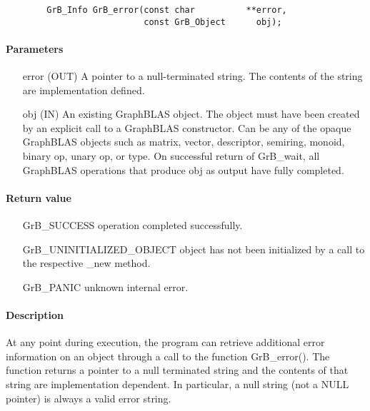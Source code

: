 \begin{verbatim}
        GrB_Info GrB_error(const char          **error,
                           const GrB_Object      obj);
\end{verbatim}

\paragraph{Parameters}

\begin{itemize}[leftmargin=1.1in]
	\item[{\sf error}] ({\sf OUT}) A pointer to a null-terminated
		string. The contents of the string are implementation
		defined.

        \item[{\sf obj}] ({\sf IN}) An existing GraphBLAS object.
        The object must have been created by an explicit call to a
        GraphBLAS constructor.  Can be any of the opaque GraphBLAS
        objects such as matrix, vector, descriptor, semiring, monoid,
        binary op, unary op, or type. On successful return of {\sf
        GrB\_wait}, all GraphBLAS operations that produce {\sf obj}
        as output have fully completed.
\end{itemize}


\paragraph{Return value}
\begin{itemize}[leftmargin=2.3in]
	\item[{\sf GrB\_SUCCESS}]			operation completed successfully.
	\item[{\sf GrB\_UNINITIALIZED\_OBJECT}]		object has not been initialized by a call to the respective {\sf *\_new} method.
	\item[{\sf GrB\_PANIC}]				unknown internal error.
\end{itemize}

\paragraph{Description}


At any point during execution, the program can retrieve additional
error information on an object through a
call to the function {\sf GrB\_error()}. 
The function returns a pointer to a null terminated string and the contents of that string
are implementation dependent. In particular, a null string (not a {\sf NULL} pointer) is always a valid error string.
